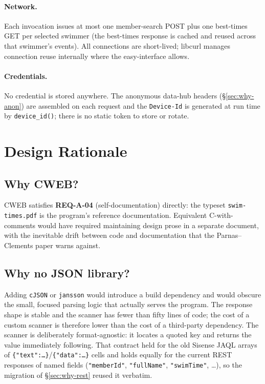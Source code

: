 \documentclass[12pt]{article}
\newcommand{\code}[1]{\texttt{#1}}
\newcommand{\req}[1]{\textbf{#1}}
\begin{document}
\paragraph{Network.}
Each invocation issues at most one member-search POST plus one
best-times GET per selected swimmer (the best-times response is
cached and reused across that swimmer's events).  All connections are
short-lived; libcurl manages connection reuse internally where the
easy-interface allows.

\paragraph{Credentials.}
No credential is stored anywhere.  The anonymous data-hub headers
(\S\ref{sec:why-anon}) are assembled on each request and the
\code{Device-Id} is generated at run time by \code{device\_id()};
there is no static token to store or rotate.

\section{Design Rationale}

\subsection{Why CWEB?}

CWEB satisfies \req{REQ-A-04} (self-documentation) directly: the
typeset \code{swim-times.pdf} is the program's reference
documentation.  Equivalent C-with-comments would have required
maintaining design prose in a separate document, with the
inevitable drift between code and documentation that the
Parnas--Clements paper warns against.

\subsection{Why no JSON library?}

Adding \code{cJSON} or \code{jansson} would introduce a build
dependency and would obscure the small, focused parsing logic
that actually serves the program.  The response shape is
stable and the scanner has fewer than fifty lines of code; the
cost of a custom scanner is therefore lower than the cost of a
third-party dependency.  The scanner is deliberately format-agnostic:
it locates a quoted key and returns the value immediately following.
That contract held for the old Sisense JAQL arrays of
\code{\{"text":\dots\}}/\code{\{"data":\dots\}} cells and holds equally
for the current REST responses of named fields
(\code{"memberId"}, \code{"fullName"}, \code{"swimTime"}, \dots),
so the migration of \S\ref{sec:why-rest} reused it verbatim.
\end{document}
